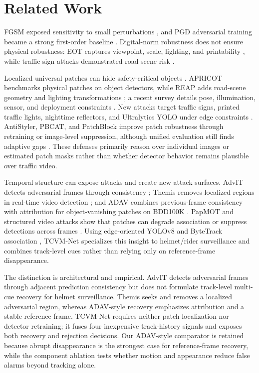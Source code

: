 \documentclass[runningheads,a4paper]{llncs}
\newcommand{\method}{TCVM-Net}
\begin{document}
\section{Related Work}

FGSM exposed sensitivity to small perturbations \cite{goodfellow2015explaining}, and PGD adversarial training became a strong first-order baseline \cite{madry2018towards}. Digital-norm robustness does not ensure physical robustness: EOT captures viewpoint, scale, lighting, and printability \cite{athalye2018synthesizing}, while traffic-sign attacks demonstrated road-scene risk \cite{eykholt2018robust}.

Localized universal patches can hide safety-critical objects \cite{brown2017adversarial}. APRICOT benchmarks physical patches on object detectors, while REAP adds road-scene geometry and lighting transformations \cite{braunegg2020apricot,hingun2023reap}; a recent survey details pose, illumination, sensor, and deployment constraints \cite{wei2026physical}. New attacks target traffic signs, printed traffic lights, nighttime reflectors, and Ultralytics YOLO under edge constraints \cite{xu2026naradv,pavlitska2025foolstoplight,suo2026rdpa,gala2025yolopatch}. AntiStyler, PBCAT, and PatchBlock improve patch robustness through retraining or image-level suppression, although unified evaluation still finds adaptive gaps \cite{yankelev2026antistyler,li2025pbcat,chattopadhyay2026patchblock,zheng2025revisiting}. These defenses primarily reason over individual images or estimated patch masks rather than whether detector behavior remains plausible over traffic video.

Temporal structure can expose attacks and create new attack surfaces. AdvIT detects adversarial frames through consistency \cite{xiao2019advit}; Themis removes localized regions in real-time video detection \cite{han2024themis}; and ADAV combines previous-frame consistency with attribution for object-vanishing patches on BDD100K \cite{mu2025adav}. PapMOT and structured video attacks show that patches can degrade association or suppress detections across frames \cite{long2024papmot,jacob2025structured}. Using edge-oriented YOLOv8 \cite{jocher2023ultralytics} and ByteTrack association \cite{zhang2022bytetrack}, \method{} specializes this insight to helmet/rider surveillance and combines track-level cues rather than relying only on reference-frame disappearance.

The distinction is architectural and empirical. AdvIT detects adversarial frames through adjacent prediction consistency but does not formulate track-level multi-cue recovery for helmet surveillance. Themis seeks and removes a localized adversarial region, whereas ADAV-style recovery emphasizes attribution and a stable reference frame. \method{} requires neither patch localization nor detector retraining; it fuses four inexpensive track-history signals and exposes both recovery and rejection decisions. Our ADAV-style comparator is retained because abrupt disappearance is the strongest case for reference-frame recovery, while the component ablation tests whether motion and appearance reduce false alarms beyond tracking alone.
\end{document}
